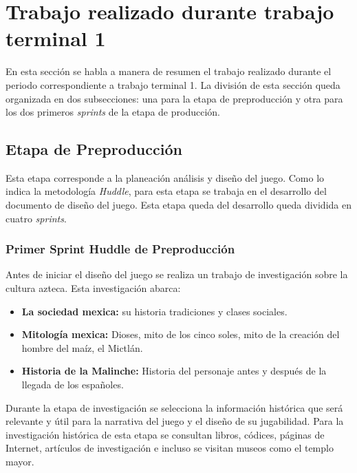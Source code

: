 \section{Trabajo realizado durante trabajo terminal 1} \label{TrabajoTerminal1}

En esta sección se habla a manera de resumen el trabajo realizado durante el
periodo correspondiente a trabajo terminal 1. La división de esta sección
queda organizada en dos subsecciones: una para la etapa de preproducción y
otra para los dos primeros \textit{sprints} de la etapa de producción.

%

\subsection{Etapa de Preproducción}\label{EtapaPreproduccion}
Esta etapa corresponde a la planeación análisis y diseño del juego. Como lo indica
la metodología \textit{Huddle}, para esta etapa se trabaja en el desarrollo del
documento de diseño del juego. Esta etapa queda del desarrollo queda dividida en
cuatro \textit{sprints}.

\subsubsection{Primer Sprint Huddle de Preproducción}\label{Prepro01}
Antes de iniciar el diseño del juego se realiza un trabajo de investigación
sobre la cultura azteca. Esta investigación abarca:
\begin{itemize}
        \item \textbf{La sociedad mexica:} su historia tradiciones y clases sociales.
        \item \textbf{Mitología mexica:} Dioses, mito de los cinco soles, mito de la
        creación del hombre del maíz, el Mictlán.
        \item \textbf{Historia de la Malinche:} Historia del personaje antes y después
        de la llegada de los españoles.
\end{itemize}
 
Durante la etapa de investigación se selecciona la información histórica que
será relevante y útil para la narrativa del juego y el diseño de su jugabilidad.
Para la investigación histórica de esta etapa se consultan libros, códices,
páginas de Internet, artículos de investigación e incluso se visitan museos
como el templo mayor.

